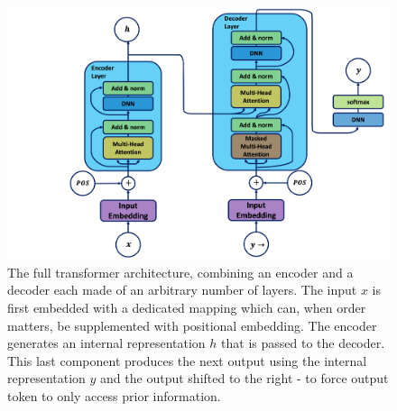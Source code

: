 \begin{figure}[h!]
    \center
    \includegraphics[scale=0.5]{Images/ML/transformer.png}
    \caption{The full transformer architecture, combining an encoder and a decoder each made of an arbitrary number of layers. The input $x$ is first embedded with a dedicated mapping which can, when order matters, be supplemented with positional embedding. The encoder generates an internal representation $h$ that is passed to the decoder. This last component produces the next output using the internal representation $y$ and the output shifted to the right - to force output token to only access prior information. } 
    \label{fig:tranfoArchi}
\end{figure}

